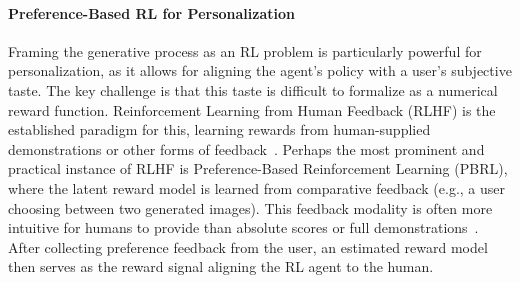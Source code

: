 \documentclass{article}
\begin{document}
\vspace{-0.2cm}  \paragraph{Preference-Based RL for Personalization}
Framing the generative process as an RL problem is particularly powerful for personalization, as it allows for aligning the agent's policy with a user's subjective taste. The key challenge is that this taste is difficult to formalize as a numerical reward function. Reinforcement Learning from Human Feedback (RLHF) is the established paradigm for this, learning rewards from human-supplied demonstrations or other forms of feedback~\citep{ziebart2008maximum, finn2016guided, lindner2023activeexplorationinversereinforcement, casper2023open}. Perhaps the most prominent and practical instance of RLHF is Preference-Based Reinforcement Learning (PBRL), where the latent reward model is learned from comparative feedback (e.g., a user choosing between two generated images). This feedback modality is often more intuitive for humans to provide than absolute scores or full demonstrations~\citep{christiano2023deepreinforcementlearninghuman, sadigh2017active, DBLP:journals/corr/abs-1910-04365, ouyang2022traininglanguagemodelsfollow, DBLP:journals/corr/abs-2111-04850, azar2023generaltheoreticalparadigmunderstand}. After collecting preference feedback from the user, an estimated reward model then serves as the reward signal aligning the RL agent to the human.
\end{document}

